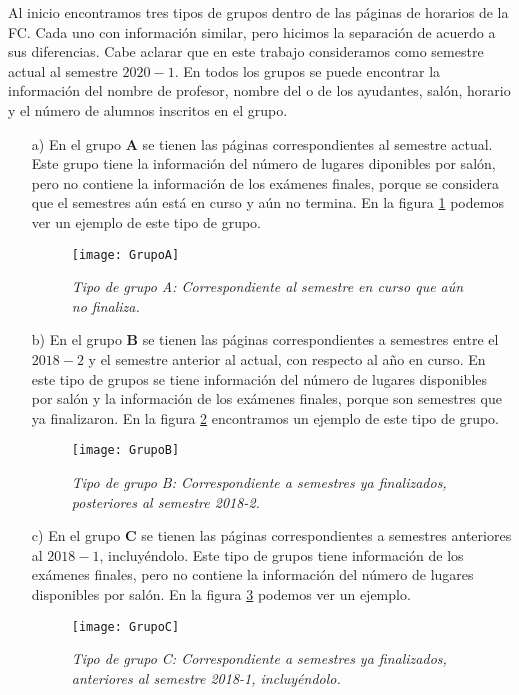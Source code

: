Al inicio encontramos tres tipos de grupos dentro de las páginas de horarios de la FC. Cada uno con información similar, pero hicimos la separación de acuerdo a sus diferencias. Cabe aclarar que en este trabajo consideramos como semestre actual al semestre $2020-1$. En todos los grupos se puede encontrar la información del nombre de profesor, nombre del o de los ayudantes, salón, horario y el número de alumnos inscritos en el grupo.

\begin{enumerate}
\item[a)] En el grupo \textbf{A} se tienen las páginas correspondientes al semestre actual. Este grupo tiene la información del número de lugares diponibles por salón, pero no contiene la información de los exámenes finales, porque se considera que el semestres aún está en curso y aún no termina. En la figura \ref{GpoA} podemos ver un ejemplo de este tipo de grupo.

\begin{figure}[H]
\centering
\texttt{[image: GrupoA]} %
\caption[\textit{Tipo de grupo A}]{\textit{Tipo de grupo A: Correspondiente al semestre en curso que aún no finaliza.}}\label{GpoA}
\end{figure}


\item[b)] En el grupo \textbf{B} se tienen las páginas correspondientes a semestres entre el $2018-2$ y el semestre anterior al actual, con respecto al año en curso. En este tipo de grupos se tiene información del número de lugares disponibles por salón y la información de los exámenes finales, porque son semestres que ya finalizaron. En la figura \ref{GpoB} encontramos un ejemplo de este tipo de grupo.

\begin{figure}[H]
\centering
\texttt{[image: GrupoB]} %
\caption[\textit{Tipo de grupo B}]{\textit{Tipo de grupo B: Correspondiente a semestres ya finalizados, posteriores al semestre 2018-2.}}\label{GpoB}
\end{figure}

\item[c)] En el grupo \textbf{C} se tienen las páginas correspondientes a semestres anteriores al $2018-1$, incluyéndolo. Este tipo de grupos tiene información de los exámenes finales, pero no contiene la información del número de lugares disponibles por salón. En la figura \ref{GpoC} podemos ver un ejemplo.

\begin{figure}[H]
\centering
\texttt{[image: GrupoC]} %
\caption[\textit{Tipo de grupo C}]{\textit{Tipo de grupo C: Correspondiente a semestres ya finalizados, anteriores al semestre 2018-1, incluyéndolo.}}\label{GpoC}
\end{figure}
\end{enumerate}



